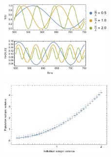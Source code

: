 \documentclass{frontiersSCNS}
\begin{document}
\begin{figure}[h!]
\centering
\includegraphics[width=0.5\textwidth]{fig_xcsin.pdf}
\caption{
}
  \label{figxcsin}
\end{figure}

\begin{figure}[h!]
\centering
\includegraphics[width=0.5\textwidth]{fig_indpopvar.pdf}
\caption{
}
  \label{figindpopvar}
\end{figure}
\end{document}
